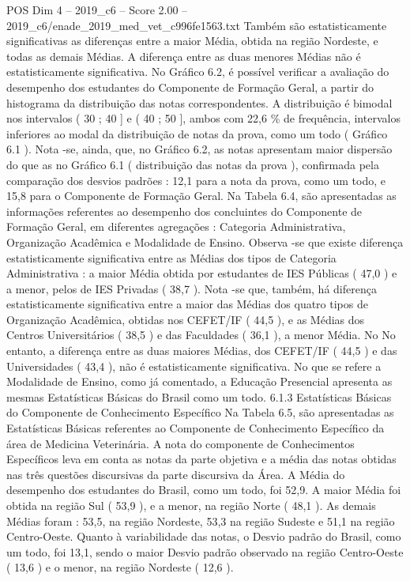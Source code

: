 \begin{textsample}{POS Dim 4 – 2019\_c6 – Score 2.00 – 2019\_c6/enade\_2019\_med\_vet\_c996fe1563.txt}
Também são estatisticamente significativas as diferenças entre a maior Média, obtida na região Nordeste, e todas as demais Médias.
A diferença entre as duas menores Médias não é estatisticamente significativa.
No Gráfico 6.2, é possível verificar a avaliação do desempenho dos estudantes do Componente de Formação Geral, a partir do histograma da distribuição das notas correspondentes.
A distribuição é bimodal nos intervalos ( 30 ; 40 ] e ( 40 ; 50 ], ambos com 22,6 \% de frequência, intervalos inferiores ao modal da distribuição de notas da prova, como um todo ( Gráfico 6.1 ).
Nota -se, ainda, que, no Gráfico 6.2, as notas apresentam maior dispersão do que as no Gráfico 6.1 ( distribuição das notas da prova ), confirmada pela comparação dos desvios padrões : 12,1 para a nota da prova, como um todo, e 15,8 para o Componente de Formação Geral.
Na Tabela 6.4, são apresentadas as informações referentes ao desempenho dos concluintes do Componente de Formação Geral, em diferentes agregações : Categoria Administrativa, Organização Acadêmica e Modalidade de Ensino.
Observa -se que existe diferença estatisticamente significativa entre as Médias dos tipos de Categoria Administrativa : a maior Média obtida por estudantes de IES Públicas ( 47,0 ) e a menor, pelos de IES Privadas ( 38,7 ).
Nota -se que, também, há diferença estatisticamente significativa entre a maior das Médias dos quatro tipos de Organização Acadêmica, obtidas nos CEFET/IF ( 44,5 ), e as Médias dos Centros Universitários ( 38,5 ) e das Faculdades ( 36,1 ), a menor Média.
No No entanto, a diferença entre as duas maiores Médias, dos CEFET/IF ( 44,5 ) e das Universidades ( 43,4 ), não é estatisticamente significativa.
No que se refere a Modalidade de Ensino, como já comentado, a Educação Presencial apresenta as mesmas Estatísticas Básicas do Brasil como um todo. 6.1.3 Estatísticas Básicas do Componente de Conhecimento Específico Na Tabela 6.5, são apresentadas as Estatísticas Básicas referentes ao Componente de Conhecimento Específico da área de Medicina Veterinária.
A nota do componente de Conhecimentos Específicos leva em conta as notas da parte objetiva e a média das notas obtidas nas três questões discursivas da parte discursiva da Área.
A Média do desempenho dos estudantes do Brasil, como um todo, foi 52,9.
A maior Média foi obtida na região Sul ( 53,9 ), e a menor, na região Norte ( 48,1 ).
As demais Médias foram : 53,5, na região Nordeste, 53,3 na região Sudeste e 51,1 na região Centro-Oeste.
Quanto à variabilidade das notas, o Desvio padrão do Brasil, como um todo, foi 13,1, sendo o maior Desvio padrão observado na região Centro-Oeste ( 13,6 ) e o menor, na região Nordeste ( 12,6 ).

\end{textsample}
